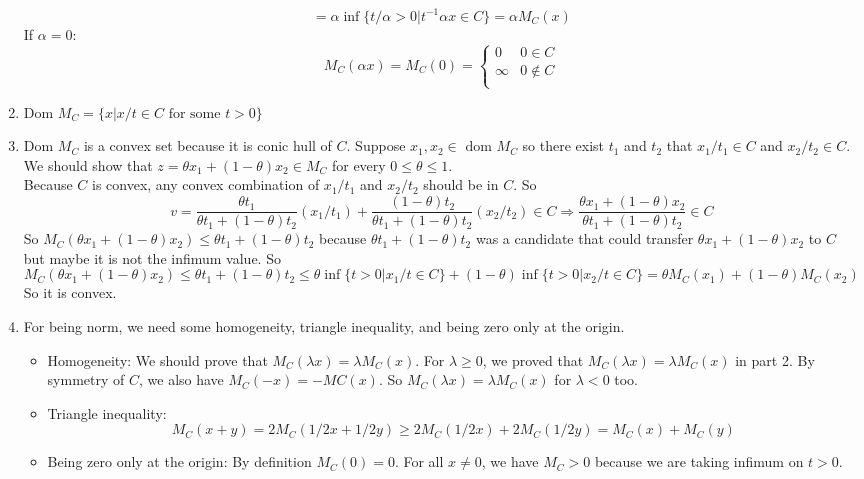 \begin{latin}
\begin{enumerate}
\begin{equation*}
		   = \alpha \inf \{t/\alpha > 0 | t^{-1} \alpha x \in C\}
		   = \alpha M_{C}(x)
	\end{equation*}
	If $ \alpha = 0 $:
	\begin{equation*}
		M_{C}(\alpha x) = M_{C}(0) = \begin{cases}
			0 & 0 \in C \\
			\infty & 0 \notin C \\
		\end{cases}
	\end{equation*} 
	\item 
	Dom $ M_{C} = \{x | x/t \in C \text{ for some } t > 0\} $
	\item 
	Dom $ M_{C} $ is a convex set because it is  conic hull of $ C $. Suppose $ x_{1}, x_{2} \in \text{ dom } M_{C} $ so there exist $ t_{1} $ and $ t_{2} $ that $ x_{1}/t_{1} \in C $ and $ x_{2}/t_{2} \in C $. We should show that $ z = \theta x_{1} + (1 - \theta) x_{2} \in M_{C}$ for every $ 0 \leq \theta \leq 1 $.
	\\
	Because $ C $ is convex, any convex combination of $ x_{1}/t_{1} $ and $ x_{2}/t_{2} $ should be in $ C $. So 
	\begin{equation*}
		v = \frac{\theta t_{1}}{\theta t_{1} + (1-\theta) t_{2}}  (x_{1}/t_{1}) +
		\frac{(1-\theta) t_{2}}{\theta t_{1} + (1-\theta) t_{2}}  (x_{2}/t_{2}) \in C
		\Rightarrow \frac{\theta x_{1} + (1-\theta) x_{2}}{\theta t_{1} + (1-\theta) t_{2}} \in C
	\end{equation*}
	So $ M_{C}(\theta x_{1} + (1-\theta) x_{2}) \leq \theta t_{1} + (1-\theta) t_{2} $ because $ \theta t_{1} + (1-\theta) t_{2} $ was a candidate that could transfer $ \theta x_{1} + (1-\theta) x_{2} $ to $ C $ but maybe it is not the infimum value. So
	\begin{equation*}
		M_{C}(\theta x_{1} + (1-\theta) x_{2}) \leq \theta t_{1} + (1-\theta) t_{2} \leq \theta \inf \{t > 0 | x_{1}/t \in C \} + (1-\theta) \inf \{t > 0 | x_{2}/t \in C \} = \theta M_{C}(x_{1}) + (1-\theta) M_{C}(x_{2}) 
	\end{equation*}
	So it is convex.
	\item 
	For being norm, we need some homogeneity, triangle inequality, and being zero only at the origin. 
	\begin{itemize}
		\item Homogeneity: We should prove that $ M_{C}(\lambda x) = \lambda M_{C}(x) $. For $ \lambda \geq 0 $, we proved that $ M_{C}(\lambda x) = \lambda M_{C}(x) $ in part 2. By symmetry of $ C $, we also have $ M_{C}(-x) = -MC(x) $. So $ M_{C}(\lambda x) = \lambda M_{C}(x) $ for $ \lambda < 0 $ too. 
		\item Triangle inequality: 
		\begin{equation*}
			M_{C}(x + y) = 2 M_{C}(1/2x + 1/2y) \geq 2 M_{C}(1/2x) + 2 M_{C}(1/2y) = M_{C}(x) + M_{C}(y)
		\end{equation*}
		\item  Being zero only at the origin: By definition $ M_{C}(0) = 0 $. For all $ x \neq 0 $, we have $ M_{C}>0 $ because we are taking infimum on $ t > 0 $. 
	\end{itemize}
\end{enumerate}

\end{latin}